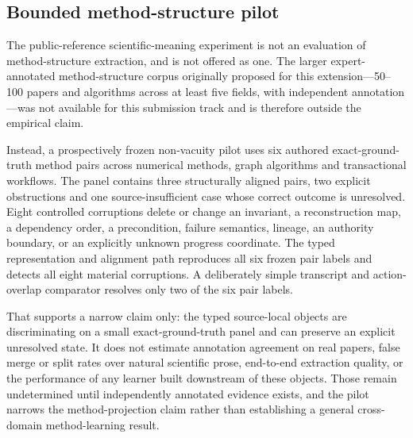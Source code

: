 \subsection{Bounded method-structure pilot}
\label{sec:method-structure-eval}

The public-reference scientific-meaning experiment is not an evaluation of
method-structure extraction, and is not offered as one. The larger
expert-annotated method-structure corpus originally proposed for this
extension---50--100 papers and algorithms across at least five fields, with
independent annotation---was not available for this submission track and is
therefore outside the empirical claim.

Instead, a prospectively frozen non-vacuity pilot uses six authored
exact-ground-truth method pairs across numerical methods, graph algorithms and
transactional workflows. The panel contains three structurally aligned pairs,
two explicit obstructions and one source-insufficient case whose correct
outcome is unresolved. Eight controlled corruptions delete or change an
invariant, a reconstruction map, a dependency order, a precondition, failure
semantics, lineage, an authority boundary, or an explicitly unknown progress
coordinate. The typed representation and alignment path reproduces all six
frozen pair labels and detects all eight material corruptions. A deliberately
simple transcript and action-overlap comparator resolves only two of the six
pair labels.

That supports a narrow claim only: the typed source-local objects are
discriminating on a small exact-ground-truth panel and can preserve an
explicit unresolved state. It does not estimate annotation agreement on real
papers, false merge or split rates over natural scientific prose, end-to-end
extraction quality, or the performance of any learner built downstream of
these objects. Those remain undetermined until independently annotated
evidence exists, and the pilot narrows the method-projection claim rather than
establishing a general cross-domain method-learning result.

\endinput
